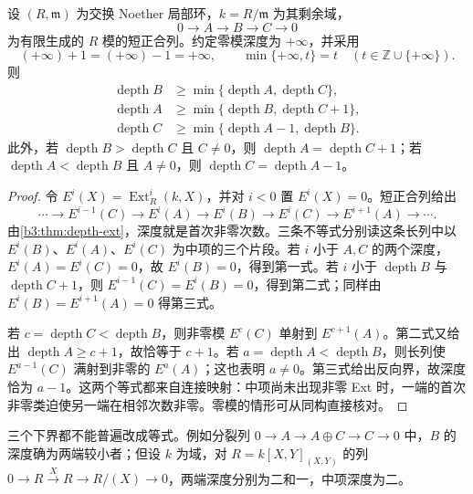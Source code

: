 \begin{theorem}[深度引理]\label{b3:thm:depth-lemma}
	设 \((R,\mathfrak m)\) 为交换 Noether 局部环，\(k=R/\mathfrak m\) 为其剩余域，
	\[
		0\longrightarrow A\longrightarrow B\longrightarrow C\longrightarrow0
	\]
	为有限生成的 \(R\) 模的短正合列。约定零模深度为 \(+\infty\)，并采用
	\[
		(+\infty)+1=(+\infty)-1=+\infty, \qquad \min\{+\infty,t\}=t \quad(t\in\mathbb Z\cup\{+\infty\}).
	\]
	则
	\begin{align*}
		\operatorname{depth}B&\ge\min\{\operatorname{depth}A,\operatorname{depth}C\},\\
		\operatorname{depth}A&\ge\min\{\operatorname{depth}B,\operatorname{depth}C+1\},\\
		\operatorname{depth}C&\ge\min\{\operatorname{depth}A-1,\operatorname{depth}B\}.
	\end{align*}
	此外，若 \(\operatorname{depth}B>\operatorname{depth}C\) 且 \(C\ne0\)，则 \(\operatorname{depth}A=\operatorname{depth}C+1\)；若 \(\operatorname{depth}A<\operatorname{depth}B\) 且 \(A\ne0\)，则 \(\operatorname{depth}C=\operatorname{depth}A-1\)。
\end{theorem}
\begin{proof}
	令 \(E^i(X)=\operatorname{Ext}_R^i(k,X)\)，并对 \(i<0\) 置 \(E^i(X)=0\)。短正合列给出
	\[
		\cdots\longrightarrow E^{i-1}(C)\longrightarrow E^i(A) \longrightarrow E^i(B)\longrightarrow E^i(C) \longrightarrow E^{i+1}(A)\longrightarrow\cdots.
	\]
	由\cref{b3:thm:depth-ext}，深度就是首次非零次数。三条不等式分别读这条长列中以 \(E^i(B)\)、\(E^i(A)\)、\(E^i(C)\) 为中项的三个片段。若 \(i\) 小于 \(A,C\) 的两个深度，\(E^i(A)=E^i(C)=0\)，故 \(E^i(B)=0\)，得到第一式。若 \(i\) 小于 \(\operatorname{depth}B\) 与 \(\operatorname{depth}C+1\)，则 \(E^{i-1}(C)=E^i(B)=0\)，得到第二式；同样由 \(E^i(B)=E^{i+1}(A)=0\) 得第三式。

	若 \(c=\operatorname{depth}C<\operatorname{depth}B\)，则非零模 \(E^c(C)\) 单射到 \(E^{c+1}(A)\)。第二式又给出 \(\operatorname{depth}A\ge c+1\)，故恰等于 \(c+1\)。若 \(a=\operatorname{depth}A<\operatorname{depth}B\)，则长列使 \(E^{a-1}(C)\) 满射到非零的 \(E^a(A)\)；这也表明 \(a\ne0\)。第三式给出反向界，故深度恰为 \(a-1\)。这两个等式都来自连接映射：中项尚未出现非零 Ext 时，一端的首次非零类迫使另一端在相邻次数非零。零模的情形可从同构直接核对。
\end{proof}

三个下界都不能普遍改成等式。例如分裂列 \(0\rightarrow A\rightarrow A\oplus C\rightarrow C\rightarrow0\) 中，\(B\) 的深度确为两端较小者；但设 \(k\) 为域，对 \(R=k[X,Y]_{(X,Y)}\) 的列 \(0\rightarrow R\xrightarrow{X}R\rightarrow R/(X)\rightarrow0\)，两端深度分别为二和一，中项深度为二。

